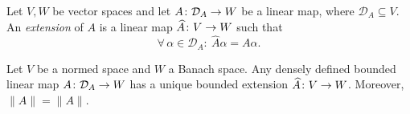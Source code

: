 \begin{definition}
Let $V,W$ be vector spaces and let $A\colon\mathcal{D}_A\to W$ be a
linear map, where $\mathcal{D}_A\subseteq V$. An
\emph{extension} of $A$ is a linear map $\widehat
A\colon V\to W$ such that
\begin{equation*}
\forall \, \alpha\in \mathcal{D}_A : \ \widehat A \alpha = A\alpha.
\end{equation*}
\end{definition}

\begin{theorem}
  \label{thm:BLT}
  Let $V$ be a normed space and $W$ a Banach space. Any densely defined
  bounded linear map $A\colon\mathcal{D}_A\to W$ has a unique bounded extension
  $\widehat A\colon V\to W$. Moreover, $\|{\widehat A}\|=\|A\|$.
\end{theorem}

